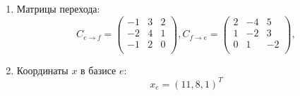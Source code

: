 \begin{enumerate}
	\item Матрицы перехода:
	      \[
		      C_{e \to f} =
		      \begin{pmatrix}
			      -1 & 3 & 2 \\
			      -2 & 4 & 1 \\
			      -1 & 2 & 0 \\
		      \end{pmatrix},
		      C_{f \to e} =
		      \begin{pmatrix}
			      2 & -4 & 5  \\
			      1 & -2 & 3  \\
			      0 & 1  & -2 \\
		      \end{pmatrix},
	      \]
	\item Координаты $x$ в базисе $e$:
	      \[
		      x_e = (11, 8, 1)^T
	      \]
\end{enumerate}